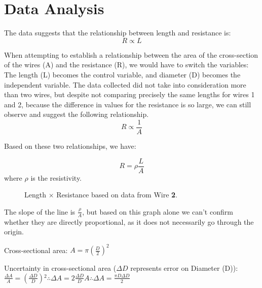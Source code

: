 \documentclass[]{article}
\begin{document}
\section{Data Analysis}

The data suggests that the relationship between length and resistance is:
\begin{equation*}
R \propto L
\end{equation*}

When attempting to establish a relationship between the area of the cross-section of the wires (A) and the resistance (R), we would have to switch the variables: The length (L) becomes the control variable, and diameter (D) becomes the independent variable. The data collected did not take into consideration more than two wires, but despite not comparing precisely the same lengths for wires 1 and 2, because the difference in values for the resistance is so large, we can still observe and suggest the following relationship.
\begin{equation*}
	R \propto \frac{1}{A}
\end{equation*}

Based on these two relationships, we have:

\begin{equation} \label{eq:R=rhoLA}
	R = \rho\frac{L}{A}
\end{equation}
where $\rho$ is the resistivity.
\begin{figure}[h]
\caption{Length $\times$ Resistance based on data from Wire \textbf{2}.}
\end{figure}

The slope of the line is $\frac{\rho}{A}$, but based on this graph alone we can't confirm whether they are directly proportional, as it does not necessarily go through the origin.

Cross-sectional area: $A = \pi(\frac{D}{2})^2$

Uncertainty in cross-sectional area ($\Delta D$ represents error on Diameter (D)): $\frac{\Delta A}{A}=(\frac{\Delta D}{D}){}^2 \therefore \Delta A = 2 \frac{\Delta D}{D}A \therefore \Delta A = \frac{\pi D \Delta D}{2} $
\end{document}
